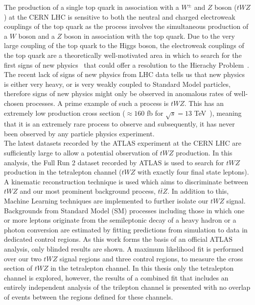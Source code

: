 The production of a single top quark in association with a $W^{\pm}$ and $Z$ boson ($tWZ$) at the CERN LHC is sensitive to both the neutral and charged electroweak couplings of the top quark as the process involves the simultaneous production of a $W$ boson and a $Z$ boson in association with the top quark. Due to the very large coupling of the top quark to the Higgs boson, the electroweak couplings of the top quark are a theoretically well-motivated area in which to search for the first signs of new physics~\cite{TopQuarkCouplings-searchNewPhysics, top-a-tool-for-disc} that could offer a resolution to the Hierachy Problem~\cite{hierarchy-problem-paper, Burdman_2015}. The recent lack of signs of new physics from LHC data tells us that new physics is either very heavy, or is very weakly coupled to Standard Model particles, therefore signs of new physics might only be observed in anomalous rates of well-chosen processes. A prime example of such a process is $tWZ$. This has an extremely low production cross section ($\approx 160$ fb for $\sqrt{s}=13$ TeV~\cite{twz-theory-paper}), meaning that it is an extremely rare process to observe and subsequently, it has never been observed by any particle physics experiment.\\

The latest datasets recorded by the ATLAS experiment at the CERN LHC are sufficiently large to allow a potential observation of $tWZ$ production. In this analysis, the Full Run 2 dataset recorded by ATLAS is used to search for $tWZ$ production in the tetralepton channel ($tWZ$ with exactly four final state leptons). A kinematic reconstruction technique is used which aims to discriminate between $tWZ$ and our most prominent background process, $t\bar{t}Z$. In addition to this, Machine Learning techniques are implemented to further isolate our $tWZ$ signal. Backgrounds from Standard Model (SM) processes including those in which one or more leptons originate from the semileptonic decay of a heavy hadron or a photon conversion are estimated by fitting predictions from simulation to data in dedicated control regions. As this work forms the basis of an official ATLAS analysis, only blinded results are shown. A maximum likelihood fit is performed over our two $tWZ$ signal regions and three control regions, to measure the cross section of $tWZ$ in the tetralepton channel. In this thesis only the tetralepton channel is explored, however, the results of a combined fit that includes an entirely independent analysis of the trilepton channel is presented with no overlap of events between the regions defined for these channels. 
